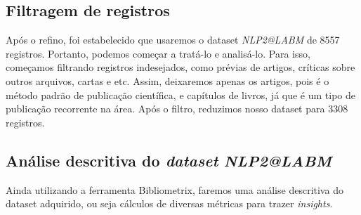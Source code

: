 \subsection{Filtragem de registros}

Após o refino, foi estabelecido que usaremos o dataset \textit{NLP2@LABM} de 8557 registros. Portanto, podemos começar a tratá-lo e analisá-lo. Para isso, começamos filtrando registros indesejados, como prévias de artigos, críticas sobre outros arquivos, cartas e etc. Assim, deixaremos apenas os artigos, pois é o método padrão de publicação científica, e capítulos de livros, já que é um tipo de publicação recorrente na área. Após o filtro, reduzimos nosso dataset para 3308 registros.

\subsection{Análise descritiva do \textit{dataset} \textit{NLP2@LABM}}

Ainda utilizando a ferramenta Bibliometrix, faremos uma análise descritiva do dataset adquirido, ou seja cálculos de diversas métricas para trazer \textit{insights}.

